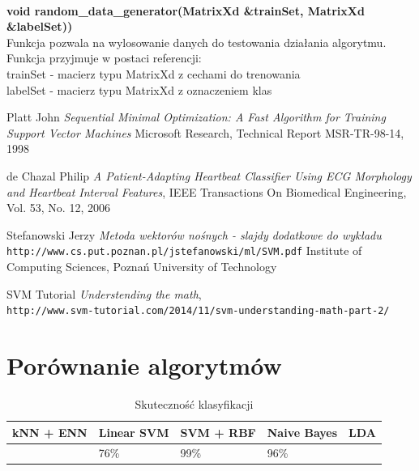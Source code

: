 \documentclass[[10pt,a4paper]{article}
\begin{document}
\newline
\newline
\newline
{}\\
\newline
\textbf {void random\_data\_generator(MatrixXd \&trainSet, MatrixXd \&labelSet))}\\
\newline
\vspace{3mm}Funkcja pozwala na wylosowanie danych do testowania działania algorytmu.\\
\vspace{3mm}Funkcja przyjmuje w postaci referencji:\\
trainSet - macierz typu MatrixXd z cechami do trenowania\\
labelSet - macierz typu MatrixXd z oznaczeniem klas\\
\begin{thebibliography}{9}

Platt John
\textit{Sequential Minimal Optimization: A Fast Algorithm for Training Support Vector Machines} 
Microsoft Research, Technical Report MSR-TR-98-14, 1998

de Chazal Philip 
\textit{A Patient-Adapting Heartbeat Classifier Using ECG Morphology and Heartbeat Interval Features},
IEEE Transactions On Biomedical Engineering, Vol. 53, No. 12, 2006

Stefanowski Jerzy
\textit{Metoda wektorów nośnych - slajdy dodatkowe do wykładu} 
\\\texttt{http://www.cs.put.poznan.pl/jstefanowski/ml/SVM.pdf}
Institute of Computing Sciences, Poznań University of Technology


SVM Tutorial
\textit{Understending the math}, 
\\\texttt{http://www.svm-tutorial.com/2014/11/svm-understanding-math-part-2/}

\end{thebibliography}

\section{Porównanie algorytmów}



\begin{table}[h]
\centering
\caption{Skuteczność klasyfikacji}
\label{accuracyTable}
\begin{tabular}{|l|l|l|l|l|}
\hline
kNN + ENN & Linear SVM & SVM + RBF & Naive Bayes & LDA \\ \hline
          & 76\%       & 99\%      & 96\%        &     \\ \hline
\end{tabular}
\end{table}
\end{document}
